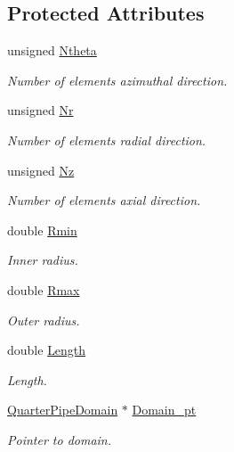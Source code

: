 \subsection*{Protected Attributes}
\begin{DoxyCompactItemize}
\item 
unsigned \hyperlink{classoomph_1_1QuarterPipeMesh_aabe271e163f56d913936d12d2c4d0f21}{Ntheta}
\begin{DoxyCompactList}\small\item\em Number of elements azimuthal direction. \end{DoxyCompactList}\item 
unsigned \hyperlink{classoomph_1_1QuarterPipeMesh_a8e6896852024ecf017ab687926fb3ef3}{Nr}
\begin{DoxyCompactList}\small\item\em Number of elements radial direction. \end{DoxyCompactList}\item 
unsigned \hyperlink{classoomph_1_1QuarterPipeMesh_a43bdaa4d81e936615332c5d43e347413}{Nz}
\begin{DoxyCompactList}\small\item\em Number of elements axial direction. \end{DoxyCompactList}\item 
double \hyperlink{classoomph_1_1QuarterPipeMesh_aa75ba32bf5f825254f1e92a00109af3e}{Rmin}
\begin{DoxyCompactList}\small\item\em Inner radius. \end{DoxyCompactList}\item 
double \hyperlink{classoomph_1_1QuarterPipeMesh_ab080d887f508016140bac78d82be37d4}{Rmax}
\begin{DoxyCompactList}\small\item\em Outer radius. \end{DoxyCompactList}\item 
double \hyperlink{classoomph_1_1QuarterPipeMesh_a00530b53de926a9a4f37cace7e2ffbdb}{Length}
\begin{DoxyCompactList}\small\item\em Length. \end{DoxyCompactList}\item 
\hyperlink{classoomph_1_1QuarterPipeDomain}{Quarter\+Pipe\+Domain} $\ast$ \hyperlink{classoomph_1_1QuarterPipeMesh_a1b3656a71bc9f6159aa237d3a76d5a15}{Domain\+\_\+pt}
\begin{DoxyCompactList}\small\item\em Pointer to domain. \end{DoxyCompactList}\end{DoxyCompactItemize}
